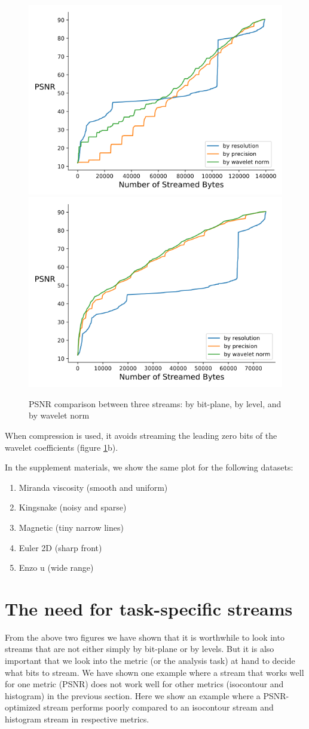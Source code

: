 \begin{figure}[t]
	\centering
	{\includegraphics[width=0.4\linewidth]{resources/rmse-miranda-viscosity.png}}
	{\includegraphics[width=0.4\linewidth]{resources/rmse-miranda-viscosity_slz.png}}
	\caption {PSNR comparison between three streams: by bit-plane, by level, and by wavelet norm}
	\label{fig:psnr_traditional_vs_by_norm_viscosity}
\end{figure}

When compression is used, it avoids streaming the leading zero bits of the wavelet coefficients (figure \ref{fig:psnr_traditional_vs_by_norm_viscosity}b).

In the supplement materials, we show the same plot for the following datasets:
\begin{enumerate}
  \item Miranda viscosity (smooth and uniform)
  \item Kingsnake (noisy and sparse)
  \item Magnetic (tiny narrow lines)
  \item Euler 2D (sharp front)
  \item Enzo u (wide range)
\end{enumerate}

\section{The need for task-specific streams}
From the above two figures we have shown that it is worthwhile to look into streams that are not either simply by bit-plane or by levels. But it is also important that we look into the metric (or the analysis task) at hand to decide what bits to stream. We have shown one example where a stream that works well for one metric (PSNR) does not work well for other metrics (isocontour and histogram) in the previous section. Here we show an example where a PSNR-optimized stream performs poorly compared to an isocontour stream and histogram stream in respective metrics.

